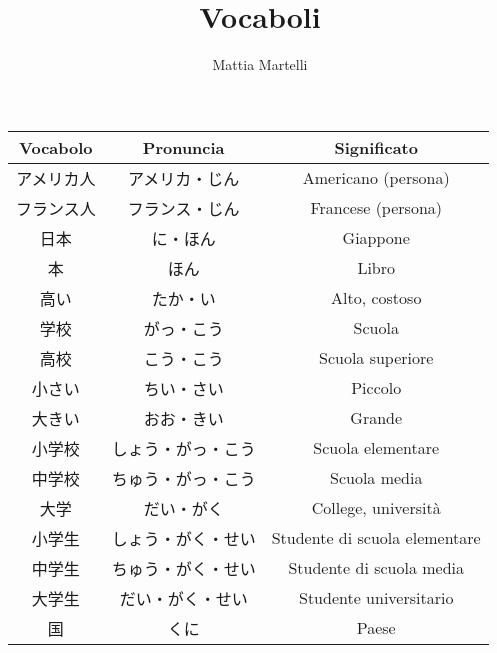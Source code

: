 \documentclass{article}
\title{Vocaboli}
\author{Mattia Martelli}
\date{}
\let\ita\textitalian
\newcommand{\itabf}[1]{\ita{\textbf{#1}}}
\begin{document}
    
    \maketitle


    \begin{center}
        \begin{japanese}
            \begin{longtable}{|c|c|c|}
                \hline
                \itabf{Vocabolo} & \itabf{Pronuncia} & \itabf{Significato}\\
                \hline\hline
                アメリカ人 & アメリカ・じん & \ita{Americano (persona)}\\
                \hline
                フランス人 & フランス・じん & \ita{Francese (persona)}\\
                \hline
                日本 & に・ほん & \ita{Giappone}\\
                \hline
                本 & ほん & \ita{Libro}\\
                \hline
                高い & たか・い & \ita{Alto, costoso}\\
                \hline
                学校 & がっ・こう & \ita{Scuola}\\
                \hline
                高校 & こう・こう & \ita{Scuola superiore}\\
                \hline
                小さい & ちい・さい & \ita{Piccolo}\\
                \hline
                大きい & おお・きい & \ita{Grande}\\
                \hline
                小学校 & しょう・がっ・こう & \ita{Scuola elementare}\\
                \hline
                中学校 & ちゅう・がっ・こう & \ita{Scuola media}\\
                \hline
                大学 & だい・がく & \ita{College, università}\\
                \hline
                小学生 & しょう・がく・せい & \ita{Studente di scuola elementare}\\
                \hline
                中学生 & ちゅう・がく・せい & \ita{Studente di scuola media}\\
                \hline
                大学生 & だい・がく・せい & \ita{Studente universitario}\\
                \hline
                国 & くに & \ita{Paese}\\

\end{longtable}
\end{japanese}
\end{center}
\end{document}
